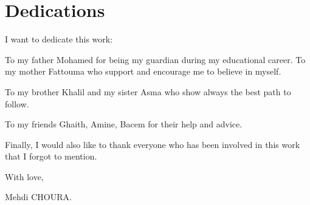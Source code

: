 \chapter*{Dedications}

\begin{center}
I want to dedicate this work:
\end{center}
\begin{center}
To my father Mohamed for being my guardian during my educational career. To my mother Fattouma who support and encourage  me to believe in myself. 
\end{center}
\begin{center}
To my brother Khalil and my sister Asma who show always the best path to follow. 
\end{center}
\begin{center}
To my friends Ghaith, Amine, Bacem for their help and advice.
\end{center}
\begin{center}
Finally, I would also like to thank everyone who has been involved in this work that I forgot to mention.
\end{center}

\begin{flushright}
With love,

Mehdi CHOURA.
\end{flushright}